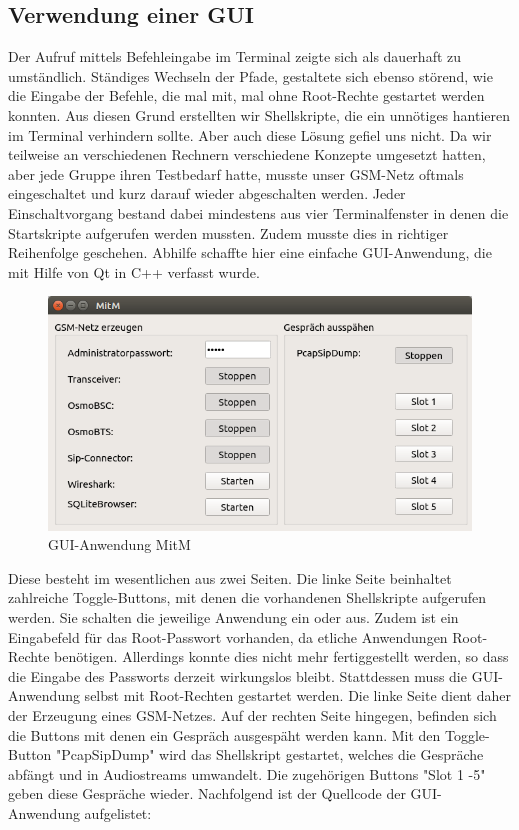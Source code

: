 
\subsection{Verwendung einer GUI}

Der Aufruf mittels Befehleingabe im Terminal zeigte sich als dauerhaft zu umständlich. Ständiges Wechseln der Pfade, gestaltete sich ebenso störend, wie die Eingabe der Befehle, die mal mit, mal ohne Root-Rechte gestartet werden konnten. Aus diesen Grund erstellten wir Shellskripte, die ein unnötiges hantieren im Terminal verhindern sollte. Aber auch diese Lösung gefiel uns nicht. Da wir teilweise an verschiedenen Rechnern verschiedene Konzepte umgesetzt hatten, aber jede Gruppe ihren Testbedarf hatte, musste unser GSM-Netz oftmals eingeschaltet und kurz darauf wieder abgeschalten werden. Jeder Einschaltvorgang bestand dabei mindestens aus vier Terminalfenster in denen die Startskripte aufgerufen werden mussten. Zudem musste dies in richtiger Reihenfolge geschehen. Abhilfe schaffte hier eine einfache GUI-Anwendung, die mit Hilfe von Qt in C++ verfasst wurde.  

\begin{figure}[h] %
\centering
\includegraphics[width=15cm]{includes/gui}
\caption{GUI-Anwendung MitM}
\label{fig:Transceiver}
\end{figure}


Diese besteht im wesentlichen aus zwei Seiten. Die linke Seite beinhaltet zahlreiche Toggle-Buttons, mit denen die vorhandenen Shellskripte aufgerufen werden. Sie schalten die jeweilige Anwendung ein oder aus. Zudem ist ein Eingabefeld für das Root-Passwort vorhanden, da etliche Anwendungen Root-Rechte benötigen. Allerdings konnte dies nicht mehr fertiggestellt werden, so dass die Eingabe des Passworts derzeit wirkungslos bleibt. Stattdessen muss die GUI-Anwendung selbst mit Root-Rechten gestartet werden. Die linke Seite dient daher der Erzeugung eines GSM-Netzes. 
Auf der rechten Seite hingegen, befinden sich die Buttons mit denen ein Gespräch ausgespäht werden kann. Mit den Toggle-Button "PcapSipDump" wird das Shellskript gestartet, welches die Gespräche abfängt und in Audiostreams umwandelt. Die zugehörigen Buttons "Slot 1 -5" geben diese Gespräche wieder. 
\newline
Nachfolgend ist der Quellcode der GUI-Anwendung aufgelistet:
\newline

